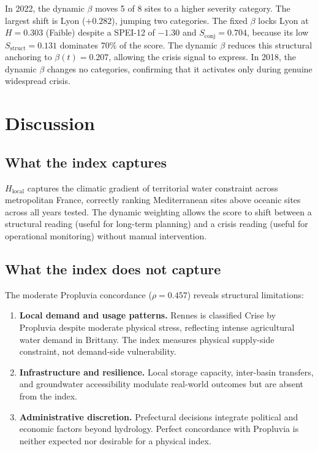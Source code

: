 \documentclass[11pt,a4paper]{article}
\begin{document}
In 2022, the dynamic $\beta$ moves 5 of 8 sites to a higher severity category. The largest shift is Lyon ($+0.282$), jumping two categories. The fixed $\beta$ locks Lyon at $H = 0.303$ (Faible) despite a SPEI-12 of $-1.30$ and $S_{\text{conj}} = 0.704$, because its low $S_{\text{struct}} = 0.131$ dominates 70\% of the score. The dynamic $\beta$ reduces this structural anchoring to $\beta(t) = 0.207$, allowing the crisis signal to express. In 2018, the dynamic $\beta$ changes no categories, confirming that it activates only during genuine widespread crisis.

\section{Discussion}

\subsection{What the index captures}

$H_{\text{local}}$ captures the climatic gradient of territorial water constraint across metropolitan France, correctly ranking Mediterranean sites above oceanic sites across all years tested. The dynamic weighting allows the score to shift between a structural reading (useful for long-term planning) and a crisis reading (useful for operational monitoring) without manual intervention.

\subsection{What the index does not capture}

The moderate Propluvia concordance ($\rho = 0.457$) reveals structural limitations:

\begin{enumerate}
  \item \textbf{Local demand and usage patterns.} Rennes is classified Crise by Propluvia despite moderate physical stress, reflecting intense agricultural water demand in Brittany. The index measures physical supply-side constraint, not demand-side vulnerability.
  \item \textbf{Infrastructure and resilience.} Local storage capacity, inter-basin transfers, and groundwater accessibility modulate real-world outcomes but are absent from the index.
  \item \textbf{Administrative discretion.} Prefectural decisions integrate political and economic factors beyond hydrology. Perfect concordance with Propluvia is neither expected nor desirable for a physical index.
\end{enumerate}
\end{document}
